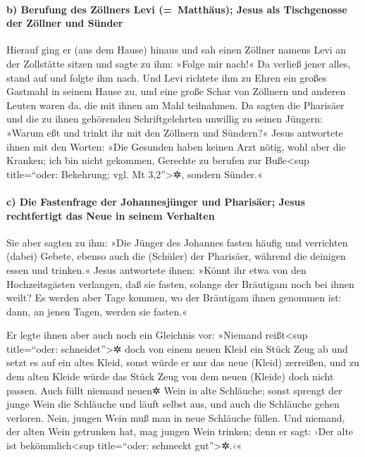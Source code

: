 \hypertarget{b-berufung-des-zuxf6llners-levi-matthuxe4us-jesus-als-tischgenosse-der-zuxf6llner-und-suxfcnder}{%
\paragraph{b) Berufung des Zöllners Levi (=~Matthäus); Jesus als
Tischgenosse der Zöllner und
Sünder}\label{b-berufung-des-zuxf6llners-levi-matthuxe4us-jesus-als-tischgenosse-der-zuxf6llner-und-suxfcnder}}

 Hierauf ging er (aus dem Hause) hinaus und sah einen
Zöllner namens Levi an der Zollstätte sitzen und sagte zu ihm: »Folge
mir nach!«  Da verließ jener alles, stand auf und folgte
ihm nach.  Und Levi richtete ihm zu Ehren ein großes
Gastmahl in seinem Hause zu, und eine große Schar von Zöllnern und
anderen Leuten waren da, die mit ihnen am Mahl teilnahmen.
 Da sagten die Pharisäer und die zu ihnen gehörenden
Schriftgelehrten unwillig zu seinen Jüngern: »Warum eßt und trinkt ihr
mit den Zöllnern und Sündern?«  Jesus antwortete ihnen
mit den Worten: »Die Gesunden haben keinen Arzt nötig, wohl aber die
Kranken;  ich bin nicht gekommen, Gerechte zu berufen zur
Buße\textless sup title=``oder: Bekehrung; vgl. Mt 3,2''\textgreater✲,
sondern Sünder.«

\hypertarget{c-die-fastenfrage-der-johannesjuxfcnger-und-pharisuxe4er-jesus-rechtfertigt-das-neue-in-seinem-verhalten}{%
\paragraph{c) Die Fastenfrage der Johannesjünger und Pharisäer; Jesus
rechtfertigt das Neue in seinem
Verhalten}\label{c-die-fastenfrage-der-johannesjuxfcnger-und-pharisuxe4er-jesus-rechtfertigt-das-neue-in-seinem-verhalten}}

 Sie aber sagten zu ihm: »Die Jünger des Johannes fasten
häufig und verrichten (dabei) Gebete, ebenso auch die (Schüler) der
Pharisäer, während die deinigen essen und trinken.« 
Jesus antwortete ihnen: »Könnt ihr etwa von den Hochzeitsgästen
verlangen, daß sie fasten, solange der Bräutigam noch bei ihnen weilt?
 Es werden aber Tage kommen, wo der Bräutigam ihnen
genommen ist: dann, an jenen Tagen, werden sie fasten.«

 Er legte ihnen aber auch noch ein Gleichnis vor:
»Niemand reißt\textless sup title=``oder: schneidet''\textgreater✲ doch
von einem neuen Kleid ein Stück Zeug ab und setzt es auf ein altes
Kleid, sonst würde er nur das neue (Kleid) zerreißen, und zu dem alten
Kleide würde das Stück Zeug von dem neuen (Kleide) doch nicht passen.
 Auch füllt niemand neuen✲ Wein in alte Schläuche; sonst
sprengt der junge Wein die Schläuche und läuft selbst aus, und auch die
Schläuche gehen verloren.  Nein, jungen Wein muß man in
neue Schläuche füllen.  Und niemand, der alten Wein
getrunken hat, mag jungen Wein trinken; denn er sagt: ›Der alte ist
bekömmlich\textless sup title=``oder: schmeckt gut''\textgreater✲.‹«

